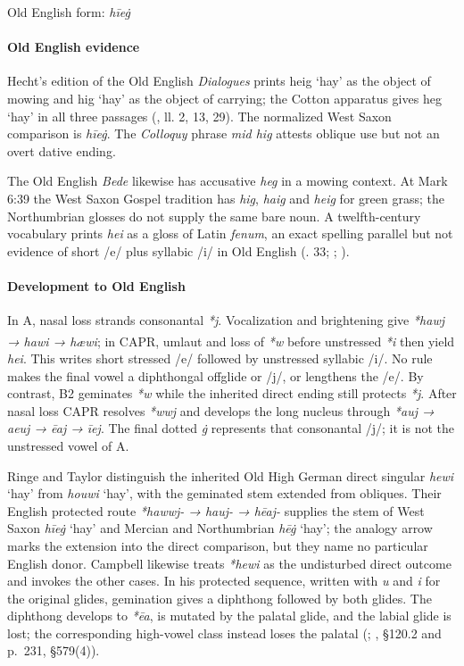\documentclass[
  british,
  a4paper,
]{article}
\providecommand{\Pred}[1]{\textsuperscript{\dag}\emph{#1}}
\begin{document}
Old English form: \emph{hīeġ}

\paragraph{Old English evidence}\label{old-english-evidence-34}

Hecht's edition of the Old English \emph{Dialogues} prints {heig} `hay'
as the object of mowing and {hig} `hay' as the object of carrying; the
Cotton apparatus gives {heg} `hay' in all three passages
(, ll. 2, 13, 29). The
normalized West Saxon comparison is \emph{hīeġ}. The \emph{Colloquy}
phrase \emph{mid hig} attests oblique use but not an overt dative
ending.

The Old English \emph{Bede} likewise has accusative \emph{heg} in a
mowing context. At Mark 6:39 the West Saxon Gospel tradition has
\emph{hig}, \emph{haig} and \emph{heig} for green grass; the
Northumbrian glosses do not supply the same bare noun. A twelfth-century
vocabulary prints \emph{hei} as a gloss of Latin \emph{fenum}, an exact
spelling parallel but not evidence of short /e/ plus syllabic /i/ in Old
English (. 33;
;
).

\paragraph{Development to Old
English}\label{development-to-old-english-34}

In A, nasal loss strands consonantal \emph{*j}. Vocalization and
brightening give \emph{*hawj → hawi → hæwi}; in CAPR, umlaut and loss of
\emph{*w} before unstressed \emph{*i} then yield \Pred{hei}. This writes
short stressed /e/ followed by unstressed syllabic /i/. No rule makes
the final vowel a diphthongal offglide or /j/, or lengthens the /e/. By
contrast, B2 geminates \emph{*w} while the inherited direct ending still
protects \emph{*j}. After nasal loss CAPR resolves \emph{*wwj} and
develops the long nucleus through \emph{*auj → aeuj → ēaj → īej}. The
final dotted \emph{ġ} represents that consonantal /j/; it is not the
unstressed vowel of A.

Ringe and Taylor distinguish the inherited Old High German direct
singular \emph{hewi} `hay' from \emph{houwi} `hay', with the geminated
stem extended from obliques. Their English protected route
\emph{*hawwj- → hauj- → hēaj-} supplies the stem of West Saxon
\emph{hīeġ} `hay' and Mercian and Northumbrian \emph{hēġ} `hay'; the
analogy arrow marks the extension into the direct comparison, but they
name no particular English donor. Campbell likewise treats \emph{*hewi}
as the undisturbed direct outcome and invokes the other cases. In his
protected sequence, written with \emph{u} and \emph{i} for the original
glides, gemination gives a diphthong followed by both glides. The
diphthong develops to \emph{*ēa}, is mutated by the palatal glide, and
the labial glide is lost; the corresponding high-vowel class instead
loses the palatal (; , §120.2
and p.~231, §579(4)).
\end{document}
